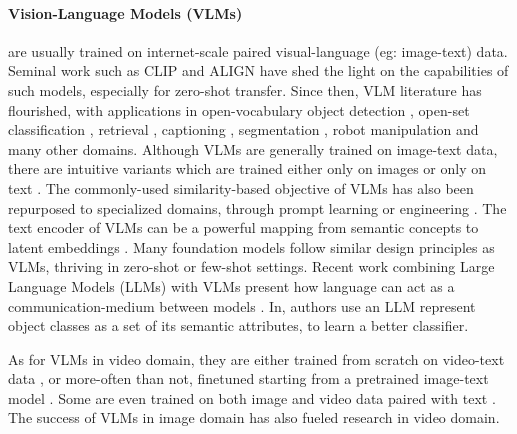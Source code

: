 \documentclass[10pt,twocolumn,letterpaper]{article}
\begin{document}
\paragraph{Vision-Language Models (VLMs)} are usually trained on internet-scale paired visual-language (eg: image-text) data. Seminal work such as CLIP \cite{radford2021clip} and ALIGN \cite{jia2021align} have shed the light on the capabilities of such models, especially for zero-shot transfer. Since then, VLM literature has flourished, with applications in open-vocabulary object detection \cite{gu2021vild, minderer2022simple}, open-set classification \cite{qian2022multimodal}, retrieval \cite{singh2022flava, yao2021filip, bain2021frozen}, captioning \cite{yang2023vid2seq}, segmentation \cite{xu2022groupvit, ranasinghe2022perceptual}, robot manipulation \cite{zeng2022socratic, jiang2022vima, karamcheti2023language} and many other domains. Although VLMs are generally trained on image-text data, there are intuitive variants which are trained either only on images \cite{tschannen2022image} or only on text \cite{nukrai2022text}. The commonly-used similarity-based objective of VLMs has also been repurposed to specialized domains, through prompt learning \cite{zhou2022learning} or engineering \cite{gu2021vild, paiss2023teaching}. The text encoder of VLMs can be a powerful mapping from semantic concepts to latent embeddings \cite{menon2022visual}. Many foundation models \cite{yuan2021florence, alayrac2022flamingo, yu2022coca} follow similar design principles as VLMs, thriving in zero-shot \cite{guo2022calip} or few-shot \cite{zhou2022learning} settings. Recent work combining Large Language Models (LLMs) with VLMs present how language can act as a communication-medium between models \cite{zeng2022socratic, zhao2022learning, wang2022language}. In\cite{menon2022visual}, authors use an LLM represent object classes as a set of its semantic attributes, to learn a better classifier. 

As for VLMs in video domain, they are either trained from scratch on video-text data \cite{xu2021videoclip, yang2023vid2seq}, or more-often than not, finetuned starting from a pretrained image-text model \cite{cheng2022vindlu, yan2022videococa, lin2022egocentric}. Some are even trained on both image and video data paired with text \cite{bain2021frozen}. The success of VLMs in image domain has also fueled research in video domain.
\end{document}
